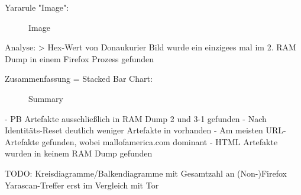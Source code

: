 Yararule "Image":
	\begin{figure}[h!]
		\centerline{}
		\label{chart:final-criteria}  
		\caption{Image}
	\end{figure}
	Analyse:
		> Hex-Wert von Donaukurier Bild wurde ein einzigees mal im 2. RAM Dump in einem Firefox Prozess gefunden
	

Zusammenfassung = Stacked Bar Chart:
\begin{figure}[h!]
	\centerline{}
	\label{chart:final-criteria}  
	\caption{Summary}
\end{figure}
- PB Artefakte ausschließlich in RAM Dump 2 und 3-1 gefunden
- Nach Identitäts-Reset deutlich weniger Artefakte in vorhanden
- Am meisten URL-Artefakte gefunden, wobei mallofamerica.com dominant 
- HTML Artefakte wurden in keinem RAM Dump gefunden


TODO: Kreisdiagramme/Balkendiagramme mit Gesamtzahl an (Non-)Firefox Yarascan-Treffer erst im Vergleich mit Tor

